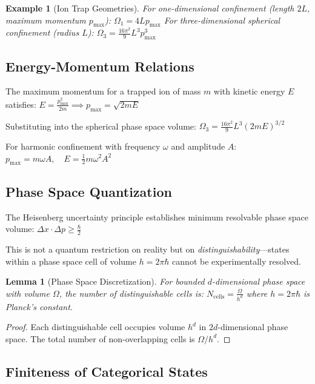 \documentclass[twocolumn,10pt]{article}
\newtheorem{lemma}[theorem]{Lemma}
\newtheorem{example}[theorem]{Example}
\begin{document}
\begin{example}[Ion Trap Geometries]
For one-dimensional confinement (length $2L$, maximum momentum $p_{\max}$):
$
\Omega_1 = 4Lp_{\max}
$
For three-dimensional spherical confinement (radius $L$):
$
\Omega_3 = \frac{16\pi^2}{9} L^3 p_{\max}^3
$
\end{example}

\subsection{Energy-Momentum Relations}

The maximum momentum for a trapped ion of mass $m$ with kinetic energy $E$ satisfies:
$
E = \frac{p_{\max}^2}{2m} \implies p_{\max} = \sqrt{2mE}
$

Substituting into the spherical phase space volume:
$
\Omega_3 = \frac{16\pi^2}{9} L^3 (2mE)^{3/2}
$

For harmonic confinement with frequency $\omega$ and amplitude $A$:
$
p_{\max} = m\omega A, \quad E = \frac{1}{2}m\omega^2 A^2
$

\subsection{Phase Space Quantization}

The Heisenberg uncertainty principle establishes minimum resolvable phase space volume:
$
\Delta x \cdot \Delta p \geq \frac{\hbar}{2}
$

This is not a quantum restriction on reality but on \emph{distinguishability}---states within a phase space cell of volume $h = 2\pi\hbar$ cannot be experimentally resolved.

\begin{lemma}[Phase Space Discretization]
\label{lem:discretization}
For bounded $d$-dimensional phase space with volume $\Omega$, the number of distinguishable cells is:
$
N_{\mathrm{cells}} = \frac{\Omega}{h^d}
$
where $h = 2\pi\hbar$ is Planck's constant.
\end{lemma}

\begin{proof}
Each distinguishable cell occupies volume $h^d$ in $2d$-dimensional phase space. The total number of non-overlapping cells is $\Omega/h^d$.
\end{proof}

\subsection{Finiteness of Categorical States}
\end{document}
